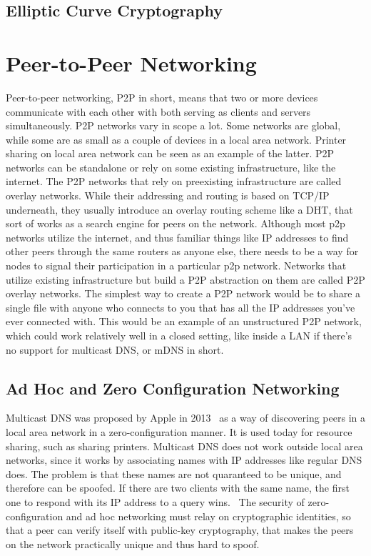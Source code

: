 \section{Elliptic Curve Cryptography}
						
\chapter{Peer-to-Peer Networking}
\label{Peer-to-Peer Networking}
Peer-to-peer networking, P2P in short, means that two or more devices communicate with each other with both serving as clients and servers simultaneously. P2P networks vary in scope a lot. Some networks are global, while some are as small as a couple of devices in a local area network. Printer sharing on local area network can be seen as an example of the latter. P2P networks can be standalone or rely on some existing infrastructure, like the internet. The P2P networks that rely on preexisting infrastructure are called overlay networks. While their addressing and routing is based on TCP/IP underneath, they usually introduce an overlay routing scheme like a DHT, that sort of works as a search engine for peers on the network.
Although most p2p networks utilize the internet, and thus familiar things like IP addresses to find other peers through the same routers as anyone else, there needs to be a way for nodes to signal their participation in a particular p2p network. Networks that utilize existing infrastructure but build a P2P abstraction on them are called P2P overlay networks. The simplest way to create a P2P network would be to share a single file with anyone who connects to you that has all the IP addresses you've ever connected with. This would be an example of an unstructured P2P network, which could work relatively well in a closed setting, like inside a LAN if there's no support for multicast DNS, or mDNS in short.

\section{Ad Hoc and Zero Configuration Networking}
Multicast DNS was proposed by Apple in 2013~\cite{Cheshire2013-ja} as a way of discovering peers in a local area network in a zero-configuration manner. It is used today for resource sharing, such as sharing printers. Multicast DNS does not work outside local area networks, since it works by associating names with IP addresses like regular DNS does. The problem is that these names are not quaranteed to be unique, and therefore can be spoofed. If there are two clients with the same name, the first one to respond with its IP address to a query wins.~\cite{Pdp2008-tg} The security of zero-configuration and ad hoc networking must relay on cryptographic identities, so that a peer can verify itself with public-key cryptography, that makes the peers on the network practically unique and thus hard to spoof.

